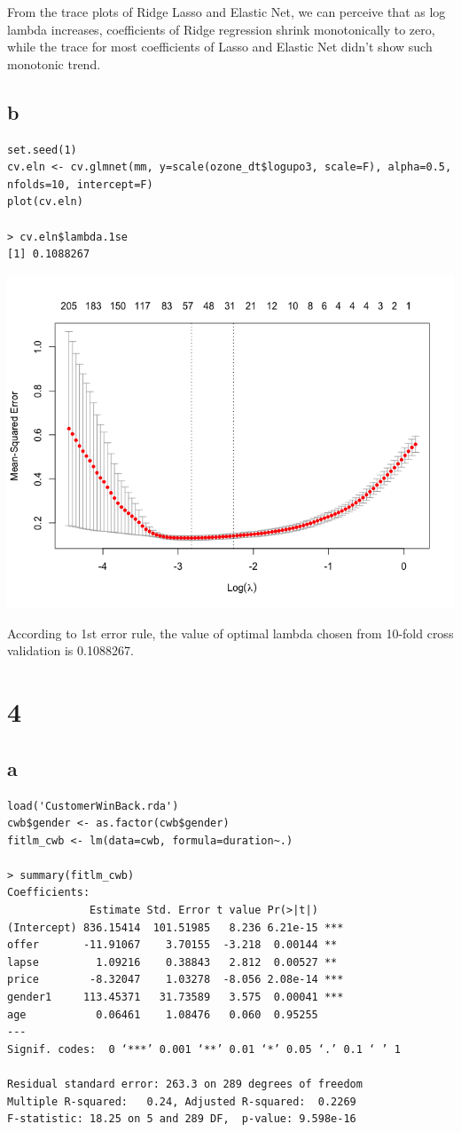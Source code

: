 \documentclass[11pt,letterpaper]{article}
\begin{document}
\noindent From the trace plots of Ridge Lasso and Elastic Net, we can perceive that as log lambda increases, coefficients of Ridge regression shrink monotonically to zero, while the trace for most coefficients of Lasso and Elastic Net didn't show such monotonic trend. 

\subsection*{b}
\begin{verbatim}
set.seed(1)
cv.eln <- cv.glmnet(mm, y=scale(ozone_dt$logupo3, scale=F), alpha=0.5, nfolds=10, intercept=F)
plot(cv.eln)

> cv.eln$lambda.1se
[1] 0.1088267
\end{verbatim}

\includegraphics[scale=0.5]{3-b-1.png}

\noindent According to 1st error rule, the value of optimal lambda chosen from 10-fold cross validation is 0.1088267.

\section*{4}
\subsection*{a}
\begin{verbatim}
load('CustomerWinBack.rda')
cwb$gender <- as.factor(cwb$gender)
fitlm_cwb <- lm(data=cwb, formula=duration~.)

> summary(fitlm_cwb)
Coefficients:
             Estimate Std. Error t value Pr(>|t|)    
(Intercept) 836.15414  101.51985   8.236 6.21e-15 ***
offer       -11.91067    3.70155  -3.218  0.00144 ** 
lapse         1.09216    0.38843   2.812  0.00527 ** 
price        -8.32047    1.03278  -8.056 2.08e-14 ***
gender1     113.45371   31.73589   3.575  0.00041 ***
age           0.06461    1.08476   0.060  0.95255    
---
Signif. codes:  0 ‘***’ 0.001 ‘**’ 0.01 ‘*’ 0.05 ‘.’ 0.1 ‘ ’ 1

Residual standard error: 263.3 on 289 degrees of freedom
Multiple R-squared:   0.24,	Adjusted R-squared:  0.2269 
F-statistic: 18.25 on 5 and 289 DF,  p-value: 9.598e-16
\end{verbatim}
\end{document}
